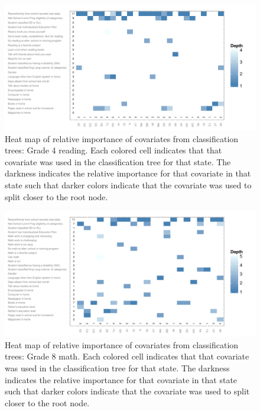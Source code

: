 \begin{figure}[h!]
\begin{center}
\includegraphics[height=.37\textheight]{../Figures2009/g4read-mlpsa-ctree-heat.pdf}
\caption[Heat map of relative importance of covariates from classification trees: Grade 4 reading]{Heat map of relative importance of covariates from classification trees: Grade 4 reading. Each colored cell indicates that that covariate was used in the classification tree for that state. The darkness indicates the relative importance for that covariate in that state such that darker colors indicate that the covariate was used to split closer to the root node.}
\label{fig:g4read-mlpsa-ctree-heat}
\end{center}
\end{figure}

\begin{figure}[h!]
\begin{center}
\includegraphics[height=.37\textheight]{../Figures2009/g8math-mlpsa-ctree-heat.pdf}
\caption[Heat map of relative importance of covariates from classification trees: Grade 8 math]{Heat map of relative importance of covariates from classification trees: Grade 8 math. Each colored cell indicates that that covariate was used in the classification tree for that state. The darkness indicates the relative importance for that covariate in that state such that darker colors indicate that the covariate was used to split closer to the root node.}
\label{fig:g8math-mlpsa-ctree-heat}
\end{center}
\end{figure}

